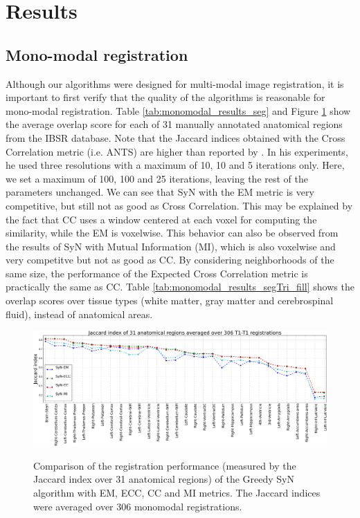 \section{Results}

\subsection{Mono-modal registration}
Although our algorithms were designed for multi-modal image registration, it is important to first verify that the quality of the algorithms is reasonable for mono-modal registration. Table \ref{tab:monomodal_results_seg} and Figure \ref{fig:mono_graph_seg} show the average overlap score for each of 31 manually annotated anatomical regions from the IBSR database. Note that the Jaccard indices obtained with the Cross Correlation metric (i.e. ANTS) are higher than reported by \cite{Rohlfing2012}. In his experiments, he used
three resolutions with a maximum of 10, 10 and 5 iterations only. Here, we set a maximum of 100, 100 and 25 iterations, leaving the rest of the parameters unchanged. We can see that SyN with the EM metric is very competitive, but still not as good as Cross Correlation. This may be explained by the fact that CC uses a window centered at each voxel for computing the similarity, while the EM is voxelwise. This behavior can also be observed from the results of SyN with Mutual Information (MI), which is also voxelwise and very competitve but not as good as CC. By considering neighborhoods of the same size, the performance of the Expected Cross Correlation metric is practically the same as CC. Table \ref{tab:monomodal_results_segTri_fill} shows the overlap scores over tissue types (white matter, gray matter and cerebrospinal fluid), instead of anatomical areas.




\begin{figure}[t!]
\centering
\includegraphics[width=1.0\linewidth]{./images/mono_lines_seg.png}\\
\caption{Comparison of the registration performance (measured by the Jaccard index over 31 anatomical regions) of the Greedy SyN algorithm with EM, ECC, CC and MI metrics. The Jaccard
indices were averaged over 306 monomodal registrations.}
\label{fig:mono_graph_seg}
\end{figure}

